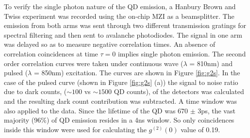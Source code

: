 To verify the single photon nature of the QD emission, a Hanbury Brown and Twiss
experiment was recorded using the on-chip MZI as a beamsplitter. The emission
from both arms was sent through two different transmission gratings for spectral
filtering and then sent to avalanche photodiodes. The signal in one arm was
delayed so as to measure negative correlation times. An absence of correlation
coincidences at time $\tau = 0$ implies single photon emission. The second order
correlation curves were taken under continuous wave ($\lambda$ = 810nm) and
pulsed ($\lambda$ = 850nm) excitation. The curves are shown in Figure
\ref{fig:g2s}. In the case of the pulsed curve (shown in Figure \ref{fig:g2s}
(a)) the signal to noise ratio due to dark counts, ($\sim \mathrm{100}$ vs $\sim
\mathrm{1500}$ QD counts), of the detectors was calculated and the resulting
dark count contribution was subtracted. A time window was also applied to the
data. Since the lifetime of the QD was 670 $\pm$ 3ps, the vast majority (96\%)
of QD emission resides in a 4ns window. So only coincidences inside this window
were used for calculating the $g^{(2)}(0)$ value of 0.19.

